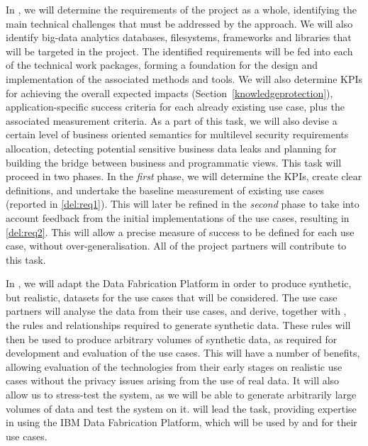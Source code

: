 \begin{Workpackage}{\thewpno}
\begin{Task}
\TaskResults{%
\ref{del:req1},
\ref{del:req2}
}
\TaskHeader{}
In \theTask{}, we will determine the requirements of the \TheProject{} project as a whole, identifying the main technical challenges that must be addressed by the \TheProject{} approach. We will also identify big-data analytics databases, filesystems, frameworks and libraries that will be targeted in the project. The identified  requirements will be fed into each of the technical work packages, forming a foundation for the design and implementation of the associated methods and tools. We will also determine KPIs for achieving the overall expected impacts (Section~\ref{knowledgeprotection}), application-specific success criteria for each already existing use case, plus the associated measurement criteria. As a part of this task, we will also devise a certain level of business oriented semantics for multilevel security requirements allocation, detecting potential sensitive business data leaks and planning for building the bridge between business and programmatic views. This task will proceed in two phases. In the \emph{first} phase, we will determine the KPIs, create clear definitions, and undertake the baseline measurement of existing use cases (reported in \ref{del:req1}). This will later be refined in the \emph{second} phase to take into account feedback from the initial implementations of the use cases, resulting in \ref{del:req2}. This will allow a precise measure of success to be defined for each use case, without over-generalisation. All of the project partners will contribute to this task.
\end{Task}

\begin{Task}
\TaskResults{%
\ref{del:eval1},
\ref{del:eval2},
\ref{del:eval3}
}
\TaskHeader{}
In \theTask{}, we will adapt the \IBMshort{} Data Fabrication Platform in order to produce synthetic, but realistic, datasets for the use cases that will be considered. The use case partners will analyse the data from their use cases, and derive, together with \IBMshort{}, the rules and relationships required to generate synthetic data. These rules will then be used to produce arbitrary volumes of synthetic data, as required for development and evaluation of the use cases. This will have a number of benefits, allowing evaluation of the \TheProject{} technologies from their early stages on realistic use cases without the privacy issues arising from the use of real data. It will also allow us to stress-test the system, as we will be able to generate arbitrarily large volumes of data and test the system on it. \IBMshort{} will lead the task, providing expertise in using the IBM Data Fabrication Platform, which will be used by \FRQshort{} and \SOPRAshort{} for their use cases.
\end{Task}


\end{Workpackage}
